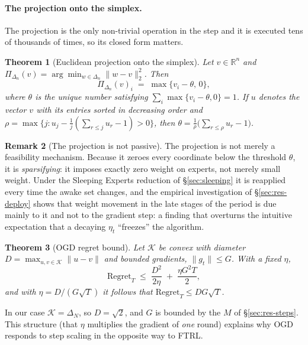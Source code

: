 \documentclass[12pt,a4paper,oneside]{report}
\renewcommand{\_}{\oldunderscore\allowbreak}
\theoremstyle{definition}
\theoremstyle{plain}
\newtheorem{theorem}{Theorem}[chapter]
\theoremstyle{definition}   %
\newtheorem{remark}[theorem]{Remark}
\begin{document}
\paragraph{The projection onto the simplex.} The projection is the only non-trivial operation
in the step and it is executed tens of thousands of times, so its closed form matters.

\begin{theorem}[Euclidean projection onto the simplex]
\label{thm:projection}
Let $v \in \mathbb{R}^n$ and $\Pi_{\Delta_n}(v) = \arg\min_{w\in\Delta_n}\|w-v\|_2^2$. Then
\[
\Pi_{\Delta_n}(v)_i \;=\; \max\{v_i - \theta,\, 0\},
\]
where $\theta$ is the unique number satisfying $\sum_i \max\{v_i-\theta,0\} = 1$. If $u$ denotes the vector $v$
with its entries sorted in decreasing order and
$\rho = \max\{j : u_j - \frac{1}{j}(\sum_{r\leq j} u_r - 1) > 0\}$, then
$\theta = \frac{1}{\rho}\big(\sum_{r\leq\rho} u_r - 1\big)$.
\end{theorem}

\begin{remark}[The projection is not passive]
The projection is not merely a feasibility mechanism. Because it zeroes every coordinate below
the threshold $\theta$, it is \emph{sparsifying}: it imposes exactly zero weight on experts,
not merely small weight. Under the Sleeping Experts reduction of \S\ref{sec:sleeping} it is
reapplied every time the awake set changes, and the empirical investigation of
\S\ref{sec:res-deploy} shows that weight movement in the late stages of the period is due
mainly to it and not to the gradient step: a finding that overturns the intuitive expectation
that a decaying $\eta_t$ ``freezes'' the algorithm.
\end{remark}

\begin{theorem}[OGD regret bound]
\label{thm:ogd}
Let $\mathcal{K}$ be convex with diameter $D = \max_{u,v\in\mathcal{K}}\|u-v\|$ and bounded
gradients, $\|g_t\| \leq G$. With a fixed $\eta$,
\[
\mathrm{Regret}_T \;\leq\; \frac{D^2}{2\eta} \;+\; \frac{\eta G^2 T}{2},
\]
and with $\eta = D/(G\sqrt{T})$ it follows that $\mathrm{Regret}_T \leq D G \sqrt{T}$.
\end{theorem}

In our case $\mathcal{K}=\Delta_N$, so $D=\sqrt{2}$, and $G$ is bounded by the $M$ of
\S\ref{sec:res-steps}. This structure (that $\eta$ multiplies the gradient of \emph{one} round)
explains why OGD responds to step scaling in the opposite way to FTRL.
\end{document}
